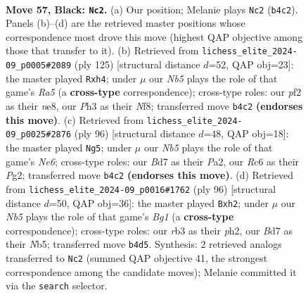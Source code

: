 \documentclass[11pt]{article}
\begin{document}
\clearpage

\begin{figure}[p]\centering
\begin{subfigure}{0.46\textwidth}\centering
\resizebox{\linewidth}{!}{%
\newchessgame
\chessboard[
  setfen={1R6/3b2k1/2r5/1p6/rn2P1PB/1R5p/5P2/7K b - - 0 57},
  showmover=false,
  pgfstyle=straightmove, color=movearrow, markmove={b4-c2}
]}
\caption{}
\end{subfigure}\hfill
\begin{subfigure}{0.46\textwidth}\centering
\resizebox{\linewidth}{!}{%
\newchessgame
\chessboard[
  setfen={R3Nn1k/5p2/8/pp1K2P1/r6P/3B4/8/8 b - - 0 63},
  showmover=false,
  pgfstyle=straightmove, color=movearrow, markmove={a4-h4}
]}
\caption{}
\end{subfigure}
\\[4pt]
\begin{subfigure}{0.46\textwidth}\centering
\resizebox{\linewidth}{!}{%
\newchessgame
\chessboard[
  setfen={7k/3R4/4N1r1/p2pP3/1p1P2K1/8/P5P1/4r3 w - - 0 49},
  showmover=false,
  pgfstyle=straightmove, color=movearrow, markmove={e6-g5}
]}
\caption{}
\end{subfigure}\hfill
\begin{subfigure}{0.46\textwidth}\centering
\resizebox{\linewidth}{!}{%
\newchessgame
\chessboard[
  setfen={6k1/R7/P5p1/1N2b3/8/5K2/r6p/6B1 w - - 0 49},
  showmover=false,
  pgfstyle=straightmove, color=movearrow, markmove={g1-h2}
]}
\caption{}
\end{subfigure}
\caption{\textbf{Move 57, Black: \texttt{Nc2}.} (a) Our position; Melanie plays \texttt{Nc2} (\texttt{b4c2}). Panels (b)--(d) are the retrieved master positions whose correspondence most drove this move (highest QAP objective among those that transfer to it). (b) Retrieved from \texttt{lichess\_elite\_2024-09\_p0005\#2089} (ply 125) [structural distance $d$=52, QAP obj=23]: the master played \texttt{Rxh4}; under $\mu$ our \emph{Nb5} plays the role of that game's \emph{Ra5} (a \textbf{cross-type} correspondence); cross-type roles: our \emph{p}f2 as their \emph{n}e8, our \emph{P}h3 as their \emph{N}f8; transferred move \texttt{b4c2} \textbf{(endorses this move)}. (c) Retrieved from \texttt{lichess\_elite\_2024-09\_p0025\#2876} (ply 96) [structural distance $d$=48, QAP obj=18]: the master played \texttt{Ng5}; under $\mu$ our \emph{Nb5} plays the role of that game's \emph{Ne6}; cross-type roles: our \emph{B}d7 as their \emph{P}a2, our \emph{R}c6 as their \emph{P}g2; transferred move \texttt{b4c2} \textbf{(endorses this move)}. (d) Retrieved from \texttt{lichess\_elite\_2024-09\_p0016\#1762} (ply 96) [structural distance $d$=50, QAP obj=36]: the master played \texttt{Bxh2}; under $\mu$ our \emph{Nb5} plays the role of that game's \emph{Bg1} (a \textbf{cross-type} correspondence); cross-type roles: our \emph{r}b3 as their \emph{p}h2, our \emph{B}d7 as their \emph{N}b5; transferred move \texttt{b4d5}. Synthesis: 2 retrieved analogs transferred to \texttt{Nc2} (summed QAP objective 41, the strongest correspondence among the candidate moves); Melanie committed it via the \texttt{search} selector.}
\label{fig:thought-m113}
\end{figure}
\end{document}
